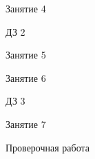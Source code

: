 \begin{class}[number=4]
	\begin{listofex}
		\item Занятие 4
	\end{listofex}
\end{class}

\begin{homework}[number=2]
	\begin{listofex}
		\item ДЗ 2
	\end{listofex}
\end{homework}

\begin{class}[number=5]
	\begin{listofex}
		\item Занятие 5
	\end{listofex}
\end{class}

\begin{class}[number=6]
	\begin{listofex}
		\item Занятие 6
	\end{listofex}
\end{class}

\begin{homework}[number=3]
	\begin{listofex}
		\item ДЗ 3
	\end{listofex}
\end{homework}

\begin{class}[number=7]
	\begin{listofex}
		\item Занятие 7
	\end{listofex}
\end{class}

\begin{exam}
	\begin{listofex}
		\item Проверочная работа
	\end{listofex}
\end{exam}

